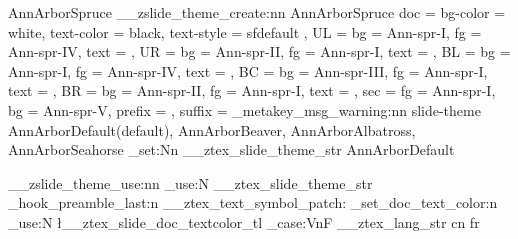 {  %
  {AnnArborSpruce}{
    \__zslide_theme_create:nn {AnnArborSpruce}{
      doc = {
        bg-color = white,
        text-color = black,
        text-style = sfdefault
      },
      UL = {
        bg   = Ann-spr-I,
        fg   = Ann-spr-IV,
        text = {\zslideUL}
      },
      UR = {
        bg   = Ann-spr-II,
        fg   = Ann-spr-I,
        text = {\zslideUR}
      },
      BL = {
        bg   = Ann-spr-I,
        fg   = Ann-spr-IV,
        text = \zslideauthor
      },
      BC = {
        bg   = Ann-spr-III,
        fg   = Ann-spr-I,
        text = \zslidetitle
      },
      BR = {
        bg   = Ann-spr-II,
        fg   = Ann-spr-I,
        text = \zslideBR
      },
      sec = {
        fg   = Ann-spr-I,
        bg   = Ann-spr-V,
        prefix = {},
        suffix = {}
      }
    }
  }
}{
  \ztex_metakey_msg_warning:nn {slide-theme}{
    AnnArborDefault(default), AnnArborBeaver, 
    AnnArborAlbatross, AnnArborSeahorse
  }
  \str_set:Nn \g__ztex_slide_theme_str {AnnArborDefault}
}


\__zslide_theme_use:nn { \str_use:N \g__ztex_slide_theme_str }{}
\ztex_hook_preamble_last:n 
  { 
    \pagestyle{empty} 
    \__ztex_text_symbol_patch:
    \zslide_set_doc_text_color:n { \tl_use:N \l__ztex_slide_doc_textcolor_tl }
    \renewcommand{\familydefault}{ \tl_use:c {\l__ztex_slide_doc_textstyle_tl} }
    \str_case:VnF \g__ztex_lang_str {
      {cn} {\renewcommand{\CJKfamilydefault}{ \tl_use:c {CJK\l__ztex_slide_doc_textstyle_tl} }}
      {fr} {}
    }{\relax} 
  }